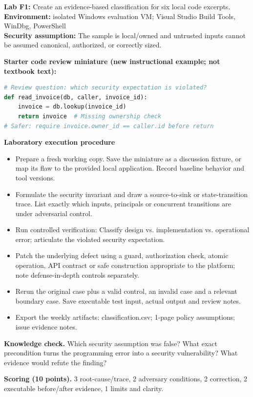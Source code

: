 \documentclass[10pt,letterpaper]{article}
\begin{document}
\begin{insight}\textbf{Lab F1:} Create an evidence-based classification for six local code excerpts.\\\textbf{Environment:} isolated Windows evaluation VM; Visual Studio Build Tools, WinDbg, PowerShell\\\textbf{Security assumption:} The sample is local/owned and untrusted inputs cannot be assumed canonical, authorized, or correctly sized.\end{insight}
\textbf{Starter code review miniature (new instructional example; not textbook text):}
\begin{lstlisting}[language=Python]
# Review question: which security expectation is violated?
def read_invoice(db, caller, invoice_id):
    invoice = db.lookup(invoice_id)
    return invoice  # Missing ownership check
# Safer: require invoice.owner_id == caller.id before return
\end{lstlisting}
\textbf{Laboratory execution procedure}
\begin{itemize}[leftmargin=*,itemsep=2pt]
\item Prepare a fresh working copy. Save the miniature as a discussion fixture, or map its flaw to the provided local application. Record baseline behavior and tool versions.
\item Formulate the security invariant and draw a source-to-sink or state-transition trace. List exactly which inputs, principals or concurrent transitions are under adversarial control.
\item Run controlled verification: Classify design vs. implementation vs. operational error; articulate the violated security expectation.
\item Patch the underlying defect using a guard, authorization check, atomic operation, API contract or safe construction appropriate to the platform; note defense-in-depth controls separately.
\item Rerun the original case plus a valid control, an invalid case and a relevant boundary case. Save executable test input, actual output and review notes.
\item Export the weekly artifacts: classification.csv; 1-page policy assumptions; issue evidence notes.
\end{itemize}
\textbf{Knowledge check.} Which security assumption was false? What exact precondition turns the programming error into a security vulnerability? What evidence would refute the finding?

\textbf{Scoring (10 points).} 3 root-cause/trace, 2 adversary conditions, 2 correction, 2 executable before/after evidence, 1 limits and clarity.
\end{document}
